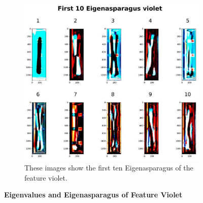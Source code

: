 \begin{figure}[!h]
	\begin{subfigure}{0.9\textwidth}
		\includegraphics[width=0.9\linewidth]{Figures/chapter04/pca_violet.png}
		\caption{These images show the first ten Eigenasparagus of the feature violet.}
	\end{subfigure}
    \caption[First Ten Eigenvalues and Eigenasparagus of Feature Violet]{\textbf{Eigenvalues and Eigenasparagus of Feature Violet}}
    \label{fig:PCAviolet}
\end{figure}


